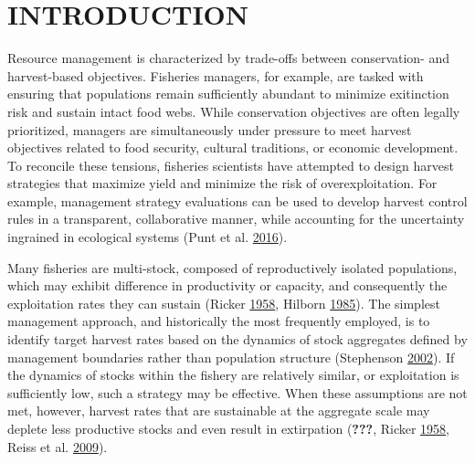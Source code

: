 \documentclass[11pt]{book}
\begin{document}
\frontmatter

\section{INTRODUCTION}\label{introduction}

Resource management is characterized by trade-offs between conservation- and harvest-based objectives. Fisheries managers, for example, are tasked with ensuring that populations remain sufficiently abundant to minimize exitinction risk and sustain intact food webs. While conservation objectives are often legally prioritized, managers are simultaneously under pressure to meet harvest objectives related to food security, cultural traditions, or economic development. To reconcile these tensions, fisheries scientists have attempted to design harvest strategies that maximize yield and minimize the risk of overexploitation. For example, management strategy evaluations can be used to develop harvest control rules in a transparent, collaborative manner, while accounting for the uncertainty ingrained in ecological systems (Punt et al. \protect\hyperlink{ref-Punt2016}{2016}).

Many fisheries are multi-stock, composed of reproductively isolated populations, which may exhibit difference in productivity or capacity, and consequently the exploitation rates they can sustain (Ricker \protect\hyperlink{ref-Ricker1958}{1958}, Hilborn \protect\hyperlink{ref-Hilborn1985}{1985}). The simplest management approach, and historically the most frequently employed, is to identify target harvest rates based on the dynamics of stock aggregates defined by management boundaries rather than population structure (Stephenson \protect\hyperlink{ref-Stephenson2002a}{2002}). If the dynamics of stocks within the fishery are relatively similar, or exploitation is sufficiently low, such a strategy may be effective. When these assumptions are not met, however, harvest rates that are sustainable at the aggregate scale may deplete less productive stocks and even result in extirpation ({\textbf{???}}, Ricker \protect\hyperlink{ref-Ricker1958}{1958}, Reiss et al. \protect\hyperlink{ref-Reiss2009}{2009}).
\end{document}
